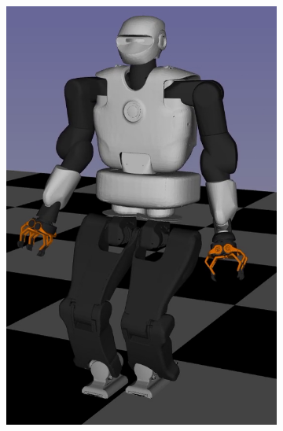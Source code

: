 \begin{figure}[t]
        \begin{subfigure}[b]{0.32\textwidth}
        \centering
        \includegraphics[width=\columnwidth]{chapter_flexible_joints/figures/talos_1.png}
    \end{subfigure}
    \hfill
    \begin{subfigure}[b]{0.32\textwidth}
        \centering

\end{subfigure}
\end{figure}
